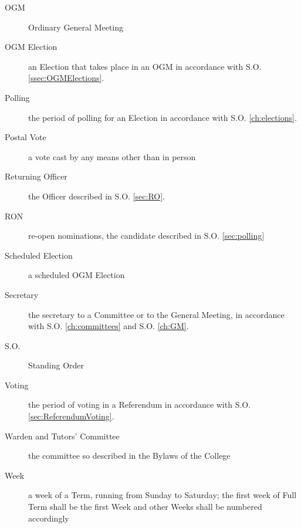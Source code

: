 \begin{description}
\item[OGM] Ordinary General Meeting
\item[OGM Election] an Election that takes place in an OGM in accordance with S.O. \ref{ssec:OGMElections}.
\item[Polling] the period of polling for an Election in accordance with S.O. \ref{ch:elections}.
\item[Postal Vote] a vote cast by any means other than in person
\item[Returning Officer] the Officer described in S.O. \ref{sec:RO}.
\item[RON] re-open nominations, the candidate described in S.O. \ref{sec:polling}
\item[Scheduled Election] a scheduled OGM Election
\item[Secretary] the secretary to a Committee or to the General Meeting, in accordance with S.O. \ref{ch:committees} and S.O. \ref{ch:GM}.
\item[S.O.] Standing Order 
\item[Voting] the period of voting in a Referendum in accordance with S.O. \ref{sec:ReferendumVoting}.
\item[Warden and Tutors' Committee] the committee so described in the Bylaws of the College
\item[Week] a week of a Term, running from Sunday to Saturday; the first week of Full Term shall be the first Week and other Weeks shall be numbered accordingly

\end{description}